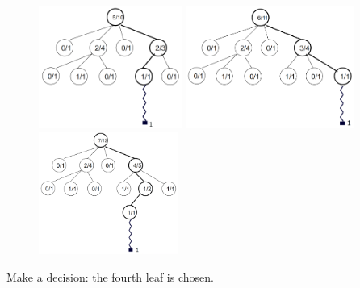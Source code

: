 \begin{figure}[H]
\centering
	\begin{minipage}[b]{0.33\linewidth}
	\centering
		\includegraphics[height=4cm]{1_Presentation/1.2_Algorithm_MCTS_Benoit/img/10.png}
	\end{minipage}%
	\begin{minipage}[b]{0.33\linewidth}
	\centering
		\includegraphics[height=4cm]{1_Presentation/1.2_Algorithm_MCTS_Benoit/img/11.png}
	\end{minipage}%
	\begin{minipage}[b]{0.33\linewidth}
	\centering
		\includegraphics[height=4cm]{1_Presentation/1.2_Algorithm_MCTS_Benoit/img/12.png}
	\end{minipage}%
\end{figure}

Make a decision: the fourth leaf is chosen.\\
\newpage

